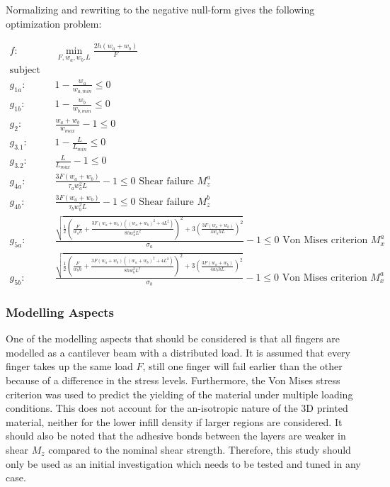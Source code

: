 Normalizing and rewriting to the negative null-form gives the following optimization problem:

\begin{align*}
	f: & \min_{F, {w_a}, {w_b}. L}  \frac{2h \left(w_a + w_b\right)}{F} \nonumber \\
	\text{subject to:} & \nonumber \\
	g_{1a}:& 1 - \frac{w_a}{w_{a,min}}  \le 0 \\
	g_{1b}:& 1 - \frac{w_b}{w_{b,min}}  \le 0 \\
	g_2:& \frac{w_a + w_b}{w_{max}}  - 1 \le 0 \\
	g_{3.1}:& 1 - \frac{L}{L_{min}} \le 0 \\
	g_{3.2}:&\frac{L}{L_{max}} - 1  \le 0 \\
	g_{4a}: & \frac{ 3 F \left(w_a + w_b \right) }{ \tau_a w_a ^2 L} - 1 \le 0					\text{ Shear failure } M_z^a \\
	g_{4b}: & \frac{ 3 F \left(w_a + w_b \right) }{ \tau_b w_b ^2 L} - 1 \le 0					\text{ Shear failure } M_z^b \\
	g_{5a}:& \frac{\sqrt{\frac{1}{2} \left( \frac{F}{w_a  h} + 	\frac{ 3 F \left(w_a + w_b \right) \left(\left(w_a + w_b \right) ^2 + 4L^2 \right)  }{ 8h w_a^2 L^2 }   \right)^2+ 3\left(	\frac{ 3 F \left(w_a + w_b \right) }{ 4  w_a h L}  \right) ^2}	} { \sigma_a} - 1	\le 0	\text{ Von Mises criterion } M_x^a \\
	g_{5b}:& \frac{\sqrt{\frac{1}{2} \left( \frac{F}{w_b  h} + 	\frac{ 3 F \left(w_a + w_b \right) \left(\left(w_a + w_b \right) ^2 + 4L^2 \right)  }{ 8h w_b^2 L^2 }   \right)^2+ 3\left(	\frac{ 3 F \left(w_a + w_b \right) }{ 4  w_b h L}  \right) ^2}	} { \sigma_b} - 1	\le 0	\text{ Von Mises criterion } M_x^a 
\end{align*}



\subsubsection{Modelling Aspects}
One of the modelling aspects that should be considered is that all fingers are modelled as a cantilever beam with a distributed load. It is assumed that every finger takes up the same load $F$, still one finger will fail earlier than the other because of a difference in the stress levels. Furthermore, the Von Mises stress criterion was used to predict the yielding of the material under multiple loading conditions. This does not account for the an-isotropic nature of the 3D printed material, neither for the lower infill density if larger regions are considered. It should also be noted that the adhesive bonds between the layers are weaker in shear $M_z$ compared to the nominal shear strength. Therefore, this study should only be used as an initial investigation which needs to be tested and tuned in any case.

